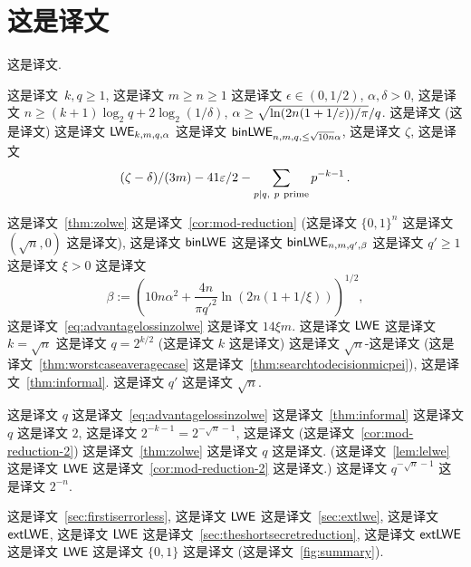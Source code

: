 

\section{这是译文}
\label{sec:shortsecret}



这是译文. 


\begin{theorem}\label{thm:zolwe} 这是译文~$k, q \ge 1$, 这是译文 $m \ge n \ge 1$ 这是译文 $\epsilon \in (0,1/2)$, $\alpha, \delta >0$, 这是译文 $n \ge (k+1) \log_2 q + 2 \log_2 (1/\delta)$, $\alpha \ge \sqrt{\ln(2n(1+1/\varepsilon))/\pi}/q$. 这是译文 (这是译文) 这是译文 $\mathsf{LWE}_{k, m, q, \alpha}$ 这是译文 $\mathsf{binLWE}_{n, m, q, \le \sqrt{10n} \alpha}$, 这是译文 $\zeta$, 这是译文  \begin{equation}\label{eq:advantagelossinzolwe}
(\zeta-\delta)/(3m) - 41 \varepsilon/2 - \sum_{p|q,~p~\text{prime}} p^{-k-1}\,.
\end{equation}
\end{theorem}

这是译文~\ref{thm:zolwe} 这是译文~\ref{cor:mod-reduction} (这是译文 $\{0,1\}^n$ 这是译文 $(\sqrt{n},0)$ 这是译文), 这是译文 $\mathsf{binLWE}$ 这是译文 $\mathsf{binLWE}_{n,m,q',\beta}$ 这是译文 $q' \ge 1$ 这是译文 $\xi>0$ 这是译文 \[
\beta := \left(10 n \alpha^2 + \frac{4n}{\pi q'^2} \ln(2n(1+1/\xi))\right)^{1/2},
\] 这是译文~\eqref{eq:advantagelossinzolwe} 这是译文 $14 \xi m$. 这是译文  $\mathsf{LWE}$ 这是译文 $k=\sqrt{n}$ 这是译文 $q=2^{k/2}$ (这是译文 $k$ 这是译文) 这是译文 $\sqrt{n}$-这是译文 (这是译文~\ref{thm:worstcaseaveragecase} 这是译文~\ref{thm:searchtodecisionmicpei}),  这是译文~\ref{thm:informal}. 这是译文 $q'$ 这是译文 $\sqrt{n}$.

这是译文 $q$ 这是译文~\eqref{eq:advantagelossinzolwe} 这是译文~\ref{thm:informal} 这是译文 $q$ 这是译文 $2$, 这是译文 $2^{-k-1}=2^{-\sqrt{n}-1}$, 这是译文 (这是译文~\ref{cor:mod-reduction-2}) 这是译文~\ref{thm:zolwe} 这是译文 $q$ 这是译文. (这是译文~\ref{lem:lelwe} 这是译文 $\mathsf{LWE}$ 这是译文~\ref{cor:mod-reduction-2} 这是译文.) 这是译文 $q^{-\sqrt{n}-1}$ 这是译文 $2^{-n}$. 

这是译文~\ref{sec:firstiserrorless}, 这是译文 $\mathsf{LWE}$ 这是译文~\ref{sec:extlwe}, 这是译文 $\mathsf{extLWE}$, 这是译文 $\mathsf{LWE}$ 这是译文~\ref{sec:theshortsecretreduction}, 这是译文 $\mathsf{extLWE}$ 这是译文 $\mathsf{LWE}$ 这是译文 $\{0,1\}$ 这是译文 (这是译文~\ref{fig:summary}). 

